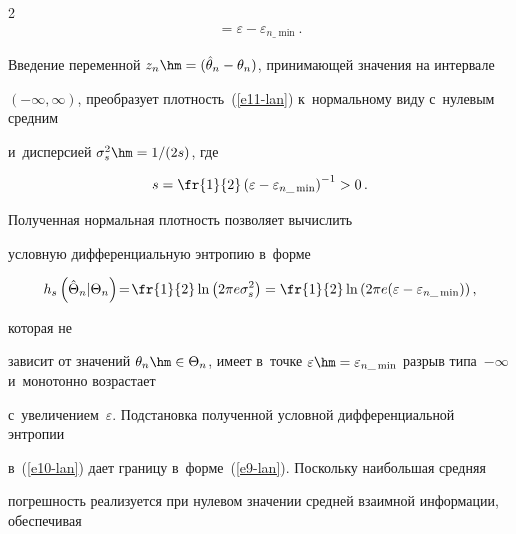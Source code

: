 \begin{multicols}{2}
\begin{multline*}
{}=\varepsilon- \varepsilon_{n\_\min}.


\end{multline*}





Введение переменной $z_n\hm= (\hat{\theta}_n-\theta_n)$, при\-ни\-ма\-ющей значения на интервале 


$(-\infty, \infty)$, преобразует плот\-ность~(\ref{e11-lan}) к~нормальному виду с~нулевым средним 


и~дисперсией $\sigma_s^2\hm= 1/(2s)$, где 


$$


s= \fr{1}{2}\left(\varepsilon-\varepsilon_{n\_\min}\right)^{-1}>0\,.


$$





\vspace*{-2pt}





\noindent


 Полученная нормальная плот\-ность поз\-во\-ля\-ет вы\-чис\-лить 


условную дифференциальную энтропию в~форме 


$$


h_s\left(\hat{\Theta}_n\vert \Theta_n\right) \!=\! \fr{1}{2} 


\ln \left(2\pi e \sigma_s^2\right)= \fr{1}{2} \ln \left(2\pi e (\varepsilon- \varepsilon_{n\_\min})\right),


$$





\vspace*{-2pt}





\noindent


 которая не 


зависит от значений $\theta_n\hm\in \Theta_n$, имеет в~точ\-ке $\varepsilon\hm= 


\varepsilon_{n\_\min}$ разрыв типа~$-\infty$ и~монотонно воз\-рас\-та\-ет 


с~увеличением~$\varepsilon$. Под\-ста\-нов\-ка полученной услов\-ной дифференциальной энтропии 


в~(\ref{e10-lan}) дает границу в~форме~(\ref{e9-lan}). Поскольку наибольшая средняя 


по\-греш\-ность реализуется при нулевом значении средней взаимной информации, обеспечивая 



\end{multicols}
